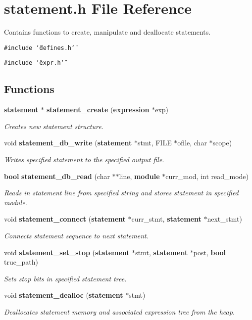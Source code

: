 \section{statement.h File Reference}
\label{statement_8h}
Contains functions to create, manipulate and deallocate statements. 


{\tt \#include \char`\"{}defines.h\char`\"{}}\par
{\tt \#include \char`\"{}expr.h\char`\"{}}\par
\subsection*{Functions}
\begin{CompactItemize}
\item 
{\bf statement} $\ast$ {\bf statement\_\-create} ({\bf expression} $\ast$exp)
\begin{CompactList}\small\item\em Creates new statement structure.\item\end{CompactList}\item 
void {\bf statement\_\-db\_\-write} ({\bf statement} $\ast$stmt, FILE $\ast$ofile, char $\ast$scope)
\begin{CompactList}\small\item\em Writes specified statement to the specified output file.\item\end{CompactList}\item 
{\bf bool} {\bf statement\_\-db\_\-read} (char $\ast$$\ast$line, {\bf module} $\ast$curr\_\-mod, int read\_\-mode)
\begin{CompactList}\small\item\em Reads in statement line from specified string and stores statement in specified module.\item\end{CompactList}\item 
void {\bf statement\_\-connect} ({\bf statement} $\ast$curr\_\-stmt, {\bf statement} $\ast$next\_\-stmt)
\begin{CompactList}\small\item\em Connects statement sequence to next statement.\item\end{CompactList}\item 
void {\bf statement\_\-set\_\-stop} ({\bf statement} $\ast$stmt, {\bf statement} $\ast$post, {\bf bool} true\_\-path)
\begin{CompactList}\small\item\em Sets stop bits in specified statement tree.\item\end{CompactList}\item 
void {\bf statement\_\-dealloc} ({\bf statement} $\ast$stmt)
\begin{CompactList}\small\item\em Deallocates statement memory and associated expression tree from the heap.\item\end{CompactList}\end{CompactItemize}


